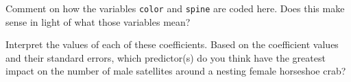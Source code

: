 \begin{question}{}
Comment on how the variables \texttt{color} and \texttt{spine} are coded here. Does this make sense in light of what those variables mean?
\end{question}

\begin{question}{}
Interpret the values of each of these coefficients. Based on the coefficient values and their standard errors, which predictor(s) do you think have the greatest impact on the number of male satellites around a nesting female horseshoe crab? 
\end{question}

